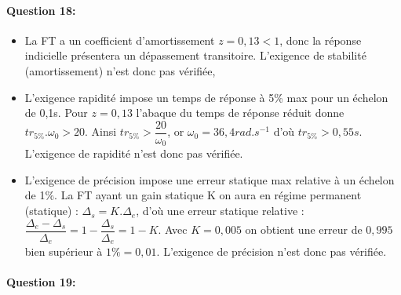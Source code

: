 \paragraph{Question 18:}

\begin{itemize}
 \item La FT a un coefficient d'amortissement $z=0,13<1$, donc la réponse indicielle présentera un dépassement transitoire. L'exigence de stabilité (amortissement) n'est donc pas vérifiée,
 \item L'exigence rapidité impose un temps de réponse à 5\% max pour un échelon de 0,1s. Pour $z=0,13$ l'abaque du temps de réponse réduit donne $tr_{5\%}.\omega_0>20$. Ainsi $tr_{5\%}>\dfrac{20}{\omega_0}$, or $\omega_0=36,4rad.s^{-1}$ d'où $tr_{5\%}>0,55s$. L'exigence de rapidité n'est donc pas vérifiée.
 \item L'exigence de précision impose une erreur statique max relative à un échelon de 1\%. La FT ayant un gain statique K on aura en régime permanent (statique) : $\Delta_s=K.\Delta_e$, d'où une erreur statique relative : $\dfrac{\Delta_e-\Delta_s}{\Delta_e}=1-\dfrac{\Delta_s}{\Delta_e}=1-K$.	
Avec $K=0,005$ on obtient une erreur de $0,995$ bien supérieur à $1\%=0,01$. L'exigence de précision n'est donc pas vérifiée.
\end{itemize}

\paragraph{Question 19:} ~\ \\ \newpage






